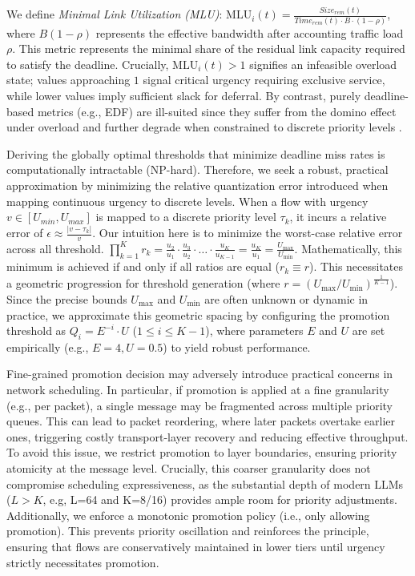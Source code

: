  We define \emph{Minimal Link Utilization (MLU)}: $\mathrm{MLU}_i(t)=\frac{\textit{Size}_{rem}(t)}{\textit{Time}_{rem}(t)\cdot B \cdot (1-\rho)}$, where $B(1-\rho)$ represents the effective bandwidth after accounting traffic load $\rho$. This metric represents the minimal share of the residual link capacity required to satisfy the deadline. Crucially, $\mathrm{MLU}_i(t) > 1$ signifies an infeasible overload state; values approaching $1$ signal critical urgency requiring exclusive service, while lower values imply sufficient slack for deferral. By contrast, purely deadline-based metrics (e.g., EDF) are ill-suited since they suffer from the domino effect under overload \cite{buttazzo1995value} and further degrade when constrained to discrete priority levels \cite{buttazzo2005rate}.

 Deriving the globally optimal thresholds that minimize deadline miss rates is computationally intractable (NP-hard). Therefore, we seek a robust, practical approximation by minimizing the relative quantization error introduced when mapping continuous urgency to discrete levels. When a flow with urgency $v \in [U_{min},U_{max}]$ is mapped to a discrete priority level $\tau_k$, it incurs a relative error of $\epsilon \approx \frac{|v - \tau_k|}{v}$. Our intuition here is to minimize the worst-case relative error across all threshold. $\prod_{k=1}^{K} r_k = \frac{u_2}{u_1} \cdot \frac{u_3}{u_2} \cdot \dots \cdot \frac{u_K}{u_{K-1}} = \frac{u_K}{u_1} = \frac{U_{\max}}{U_{\min}}$. Mathematically, this minimum is achieved if and only if all ratios are equal ($r_k \equiv r$). This necessitates a geometric progression for threshold generation (where $r =(U_{\max}/U_{\min})^{\frac{1}{K-1}}$). Since the precise bounds $U_{\max}$ and $U_{\min}$ are often unknown or dynamic in practice, we approximate this geometric spacing by configuring the promotion threshold as $Q_i = E^{-i}\cdot U$ ($1\le i\le K-1$), where parameters $E$ and $U$ are set empirically (e.g., $E=4, U=0.5$) to yield robust performance.

Fine-grained promotion decision may adversely introduce practical concerns in network scheduling. In particular, if promotion is applied at a fine granularity (e.g., per packet), a single message may be fragmented across multiple priority queues. This can lead to packet reordering, where later packets overtake earlier ones, triggering costly transport-layer recovery and reducing effective throughput. To avoid this issue, we restrict promotion to layer boundaries, ensuring priority atomicity at the message level. Crucially, this coarser granularity does not compromise scheduling expressiveness, as the substantial depth of modern LLMs ($L>K$, e.g, L=64 and K=8/16) provides ample room for priority adjustments. Additionally, we enforce a monotonic promotion policy (i.e., only allowing promotion). This prevents priority oscillation and reinforces the \DAP{} principle, ensuring that flows are conservatively maintained in lower tiers until urgency strictly necessitates promotion.


